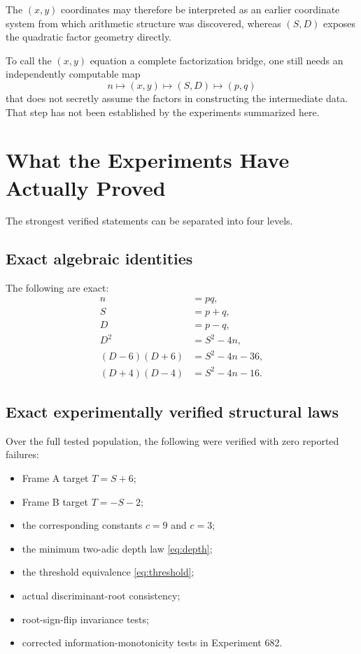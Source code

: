 \documentclass[11pt,a4paper]{article}
\begin{document}
The $(x,y)$ coordinates may therefore be interpreted as an earlier coordinate system from which arithmetic structure was discovered, whereas $(S,D)$ exposes the quadratic factor geometry directly.

To call the $(x,y)$ equation a complete factorization bridge, one still needs an independently computable map
\[
 n\longmapsto(x,y)\longmapsto(S,D)\longmapsto(p,q)
\]
that does not secretly assume the factors in constructing the intermediate data.
That step has not been established by the experiments summarized here.

\section{What the Experiments Have Actually Proved}

The strongest verified statements can be separated into four levels.

\subsection{Exact algebraic identities}
The following are exact:
\begin{align}
 n&=pq,\\
 S&=p+q,\\
 D&=p-q,\\
 D^2&=S^2-4n,\\
 (D-6)(D+6)&=S^2-4n-36,\\
 (D+4)(D-4)&=S^2-4n-16.
\end{align}

\subsection{Exact experimentally verified structural laws}
Over the full tested population, the following were verified with zero reported failures:
\begin{itemize}[leftmargin=1.7em]
    \item Frame A target $T=S+6$;
    \item Frame B target $T=-S-2$;
    \item the corresponding constants $c=9$ and $c=3$;
    \item the minimum two-adic depth law \eqref{eq:depth};
    \item the threshold equivalence \eqref{eq:threshold};
    \item actual discriminant-root consistency;
    \item root-sign-flip invariance tests;
    \item corrected information-monotonicity tests in Experiment 682.
\end{itemize}
\end{document}
